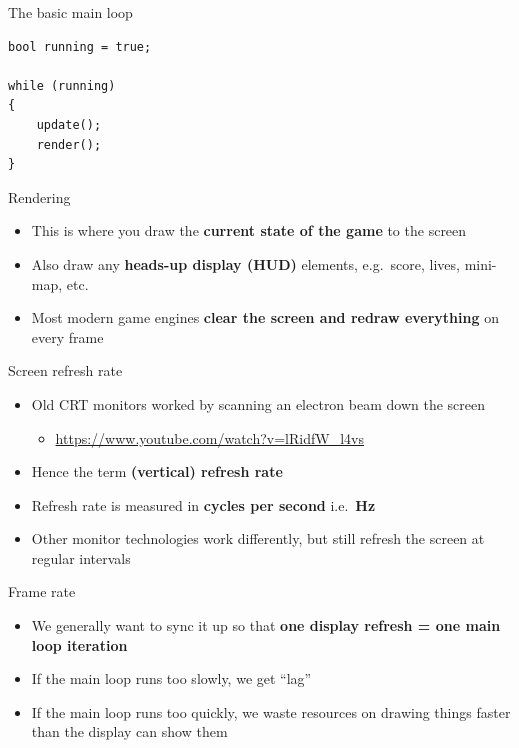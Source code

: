 \begin{frame}[fragile]{The basic main loop}
    \begin{lstlisting}
bool running = true;

while (running)
{
    update();
    render();
}
    \end{lstlisting}
\end{frame}

\begin{frame}{Rendering}
    \begin{itemize}
        \pause\item This is where you draw the \textbf{current state of the game} to the screen 
        \pause\item Also draw any \textbf{heads-up display (HUD)} elements,
            e.g.\ score, lives, mini-map, etc. 
        \pause\item Most modern game engines \textbf{clear the screen and redraw everything} on every frame 
    \end{itemize}
\end{frame}

\begin{frame}{Screen refresh rate}
    \begin{itemize}
        \pause\item Old CRT monitors worked by scanning an electron beam down the screen
            \begin{itemize}
                \pause\item \url{https://www.youtube.com/watch?v=lRidfW_l4vs} 
            \end{itemize}
        \pause\item Hence the term \textbf{(vertical) refresh rate} 
        \pause\item Refresh rate is measured in \textbf{cycles per second} i.e.\ \textbf{Hz} 
        \pause\item Other monitor technologies work differently, but still refresh the screen at regular intervals
    \end{itemize}
\end{frame}

\begin{frame}{Frame rate}
    \begin{itemize}
        \pause\item We generally want to sync it up so that \newline
            \textbf{one display refresh = one main loop iteration} 
        \pause\item If the main loop runs too slowly, we get ``lag'' 
        \pause\item If the main loop runs too quickly, we waste resources on drawing things faster than the display can show them
    \end{itemize}
\end{frame}

